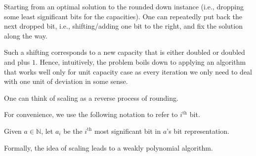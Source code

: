 \begin{intuition}
	Starting from an optimal solution to the rounded down instance (i.e., dropping some least significant bits for the capacities). One can repeatedly put back the next dropped bit, i.e., shifting/adding one bit to the right, and fix the solution along the way.
\end{intuition}

Such a shifting corresponds to a new capacity that is either doubled or doubled and plus \(1\). Hence, intuitively, the problem boils down to applying an algorithm that works well only for unit capacity case as every iteration we only need to deal with one unit of deviation in some sense.

\begin{note}
	One can think of scaling as a reverse process of rounding.
\end{note}

For convenience, we use the following notation to refer to \(i^{\text{th} }\) bit.

\begin{notation}
	Given \(a \in \mathbb{N} \), let \(a_i\) be the \(i^{\text{th} }\) most significant bit in \(a\)'s bit representation.
\end{notation}

Formally, the idea of scaling leads to a weakly polynomial algorithm.

